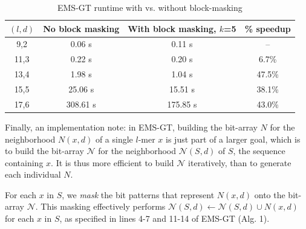 \documentclass[conference]{IEEEtran}
\begin{document}
\begin{enumerate}[label={\em \arabic*.}]
			\begin{table}[h] %
				\renewcommand{\arraystretch}{1.3}
				\caption{EMS-GT runtime with vs. without block-masking}
				\label{tbl:speedup_blockmasking}
				\centering
				\begin{tabular}{|c|c|c|c|}
				\hline 
				\bfseries\boldmath $(l,d)$ & \bfseries No block masking & \bfseries\boldmath With block masking, $k$=5 & \bfseries \% speedup\\
				\hline
				 9,2 &   0.06 s &    0.11 s &     --  \\
				11,3 &   0.22 s &    0.20 s &    6.7\%\\
				13,4 &   1.98 s &    1.04 s &   47.5\%\\
				15,5 &  25.06 s &   15.51 s &   38.1\%\\
				17,6 & 308.61 s &  175.85 s &   43.0\%\\
				\hline\end{tabular}
				\end{table}

			Finally, an implementation note: in EMS-GT, building the bit-array $N$ for the neighborhood $N(x,d)$ of a single $l$-mer $x$ is just part of a larger goal, which is to build the bit-array $\mathcal{N}$ for the neighborhood $\mathcal{N}(S,d)$ of $S$, the sequence containing $x$. It is thus more efficient to build $\mathcal{N}$ iteratively, than to generate each individual $N$.\newline

			For each $x$ in $S$, we \emph{mask} the bit patterns that represent $N(x,d)$ onto the bit-array $\mathcal{N}$. This masking effectively performs $\mathcal{N}(S,d) \leftarrow \mathcal{N}(S,d) \cup N(x,d)$ for each $x$ in $S$, as specified in lines 4-7 and 11-14 of EMS-GT (Alg. 1).			
			\end{enumerate}	

\end{document}
